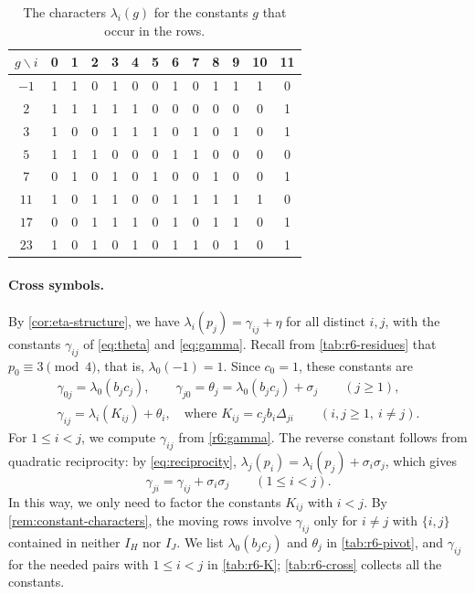 \documentclass[12pt,oneside,openany]{book}
\theoremstyle{definition}
\theoremstyle{plain}
\numberwithin{equation}{chapter}
\theoremstyle{plain}
\theoremstyle{definition}
\theoremstyle{remark}
\begin{document}
\begin{table}[htbp]
\centering
\caption{The characters $\lambda_i(g)$ for the constants $g$ that occur in the rows.}
\label{tab:r6-chars}
\begin{tabular}{c*{12}{c}}
\toprule
$g\backslash i$ & 0 & 1 & 2 & 3 & 4 & 5 & 6 & 7 & 8 & 9 & 10 & 11\\
\midrule
$-1$ & 1 & 1 & 0 & 1 & 0 & 0 & 1 & 0 & 1 & 1 & 1 & 0 \\
$2$ & 1 & 1 & 1 & 1 & 1 & 0 & 0 & 0 & 0 & 0 & 0 & 1 \\
$3$ & 1 & 0 & 0 & 1 & 1 & 1 & 0 & 1 & 0 & 1 & 0 & 1 \\
$5$ & 1 & 1 & 1 & 0 & 0 & 0 & 1 & 1 & 0 & 0 & 0 & 0 \\
$7$ & 0 & 1 & 0 & 1 & 0 & 1 & 0 & 0 & 1 & 0 & 0 & 1 \\
$11$ & 1 & 0 & 1 & 1 & 0 & 0 & 1 & 1 & 1 & 1 & 1 & 0 \\
$17$ & 0 & 0 & 1 & 1 & 1 & 0 & 1 & 0 & 1 & 1 & 0 & 1 \\
$23$ & 1 & 0 & 1 & 0 & 1 & 0 & 1 & 1 & 0 & 1 & 0 & 1 \\
\bottomrule
\end{tabular}
\end{table}

\paragraph{Cross symbols.} By \cref{cor:eta-structure}, we have $\lambda_i(p_j)=\gamma_{ij}+\eta$ for all distinct $i,j$, with the constants $\gamma_{ij}$ of \eqref{eq:theta} and \eqref{eq:gamma}. Recall from \cref{tab:r6-residues} that $p_0\equiv3\pmod4$, that is, $\lambda_0(-1)=1$. Since $c_0=1$, these constants are
\begin{equation}\label{r6:gamma}
\begin{gathered}
\gamma_{0j}=\lambda_0(b_jc_j),\qquad \gamma_{j0}=\theta_j=\lambda_0(b_jc_j)+\sigma_j\qquad(j\ge1),\\
\gamma_{ij}=\lambda_i(K_{ij})+\theta_i,\quad\text{where } K_{ij}=c_jb_i\Delta_{ji}\qquad(i,j\ge1,\ i\ne j).
\end{gathered}
\end{equation}
For $1\le i<j$, we compute $\gamma_{ij}$ from \eqref{r6:gamma}. The reverse constant follows from quadratic reciprocity: by \eqref{eq:reciprocity}, $\lambda_j(p_i)=\lambda_i(p_j)+\sigma_i\sigma_j$, which gives
\begin{equation}\label{r6:reverse}
\gamma_{ji}=\gamma_{ij}+\sigma_i\sigma_j\qquad(1\le i<j).
\end{equation}
In this way, we only need to factor the constants $K_{ij}$ with $i<j$. By \cref{rem:constant-characters}, the moving rows involve $\gamma_{ij}$ only for $i\ne j$ with $\{i,j\}$ contained in neither $I_H$ nor $I_J$. We list $\lambda_0(b_jc_j)$ and $\theta_j$ in \cref{tab:r6-pivot}, and $\gamma_{ij}$ for the needed pairs with $1\le i<j$ in \cref{tab:r6-K}; \cref{tab:r6-cross} collects all the constants.
\end{document}
